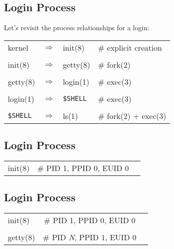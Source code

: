 \documentclass[xga]{xdvislides}
\begin{document}
\subsection{Login Process}
Let's revisit the process relationships for a login:
\vspace*{\fill}
\begin{center}
\begin{tabular}[width=.75\texwidth]{l c l l }
kernel & $\Rightarrow$ & init(8) & \# explicit creation \\
\\
init(8) & $\Rightarrow$ & getty(8) & \# fork(2) \\
\\
getty(8) & $\Rightarrow$ & login(1) & \# exec(3) \\
\\
login(1) & $\Rightarrow$ & \verb+$SHELL+ & \# exec(3) \\
\\
\verb+$SHELL+ & $\Rightarrow$ & ls(1) & \# fork(2) + exec(3) \\
\end{tabular}
\end{center}
\vspace*{\fill}

\subsection{Login Process}
\vspace*{\fill}
\begin{center}
\begin{tabular}[width=.75\texwidth]{l c l}
init(8) & \# PID 1, PPID 0, EUID 0\\
\end{tabular}
\vspace*{\fill}
\end{center}

\subsection{Login Process}
\vspace*{\fill}
\begin{center}
\begin{tabular}[width=.75\texwidth]{l c l}
init(8) & \# PID 1, PPID 0, EUID 0\\
\\
getty(8) & \# PID {\em N}, PPID 1, EUID 0\\
\end{tabular}
\vspace*{\fill}
\end{center}
\end{document}
